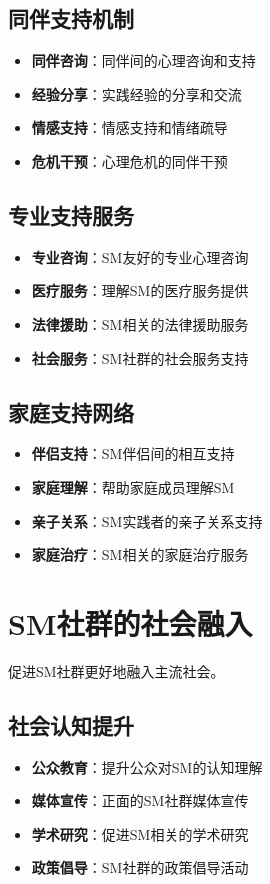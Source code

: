 \documentclass[12pt,UTF8]{ctexbook}
\begin{document}
\subsection{同伴支持机制}
\begin{itemize}[leftmargin=2cm]
	\item \textbf{同伴咨询}：同伴间的心理咨询和支持
	\item \textbf{经验分享}：实践经验的分享和交流
	\item \textbf{情感支持}：情感支持和情绪疏导
	\item \textbf{危机干预}：心理危机的同伴干预
\end{itemize}

\subsection{专业支持服务}
\begin{itemize}[leftmargin=2cm]
	\item \textbf{专业咨询}：SM友好的专业心理咨询
	\item \textbf{医疗服务}：理解SM的医疗服务提供
	\item \textbf{法律援助}：SM相关的法律援助服务
	\item \textbf{社会服务}：SM社群的社会服务支持
\end{itemize}

\subsection{家庭支持网络}
\begin{itemize}[leftmargin=2cm]
	\item \textbf{伴侣支持}：SM伴侣间的相互支持
	\item \textbf{家庭理解}：帮助家庭成员理解SM
	\item \textbf{亲子关系}：SM实践者的亲子关系支持
	\item \textbf{家庭治疗}：SM相关的家庭治疗服务
\end{itemize}

\section{SM社群的社会融入}
促进SM社群更好地融入主流社会。

\subsection{社会认知提升}
\begin{itemize}[leftmargin=2cm]
	\item \textbf{公众教育}：提升公众对SM的认知理解
	\item \textbf{媒体宣传}：正面的SM社群媒体宣传
	\item \textbf{学术研究}：促进SM相关的学术研究
	\item \textbf{政策倡导}：SM社群的政策倡导活动
\end{itemize}
\end{document}
